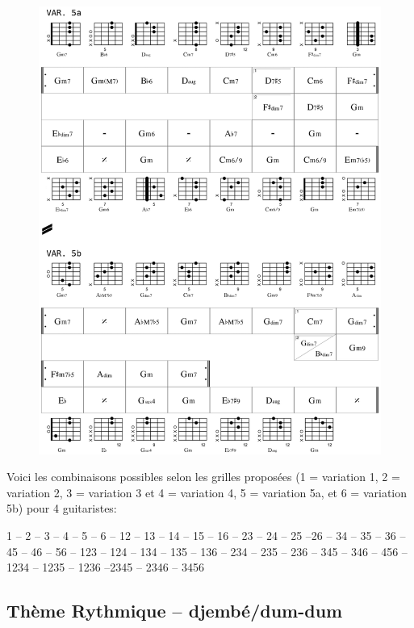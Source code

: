  \begin{figure}[H]
\begin{center}
\includegraphics[width=\textwidth]{img/dlc4}
\end{center}
\end{figure}

Voici les combinaisons possibles selon les grilles propos\'{e}es (1 = variation 1, 2 = variation 2, 3 = variation 3 et 4 = variation 4, 5 = variation 5a, et 6 = variation 5b) pour 4 guitaristes: 

1 -- 2 -- 3 -- 4 -- 5 -- 6 -- 12 -- 13 -- 14 -- 15 -- 16 --  23 -- 24 -- 25 --26 -- 34 -- 35 -- 36 -- 45 -- 46 -- 56 -- 123 -- 124 -- 134 -- 135 -- 136 -- 234 -- 235 -- 236 -- 345 -- 346 -- 456 -- 1234 -- 1235 -- 1236 --2345 -- 2346 -- 3456 %
 
\bigskip

\subsection*{Th\`{e}me Rythmique -- djemb\'{e}/dum-dum}

